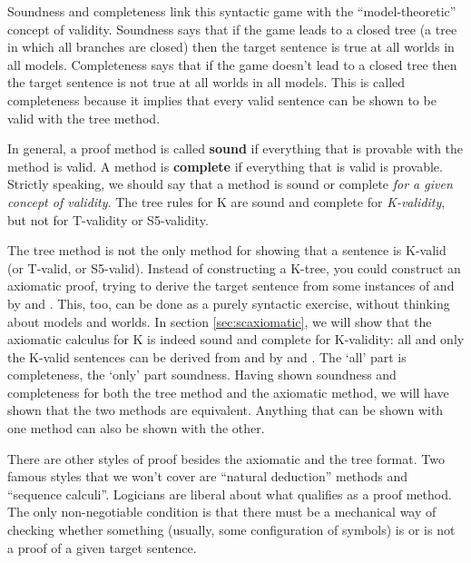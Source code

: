 Soundness and completeness link this syntactic game with the ``model-theoretic''
concept of validity. Soundness says that if the game leads to a closed tree (a
tree in which all branches are closed) then the target sentence is true at all
worlds in all models. Completeness says that if the game doesn't lead to a
closed tree then the target sentence is not true at all worlds in all models.
This is called completeness because it implies that every valid sentence can be
shown to be valid with the tree method.

In general, a proof method is called \textbf{sound} if everything that is
provable with the method is valid. A method is \textbf{complete} if everything
that is valid is provable. Strictly speaking, we should say that a method is
sound or complete \emph{for a given concept of validity}. The tree rules for K
are sound and complete for \emph{K-validity}, but not for T-validity or
S5-validity.

The tree method is not the only method for showing that a sentence is K-valid
(or T-valid, or S5-valid). Instead of constructing a K-tree, you could construct
an axiomatic proof, trying to derive the target sentence from some instances of
 and  by  and . This, too, can be done as a
purely syntactic exercise, without thinking about models and worlds. In section
\ref{sec:scaxiomatic}, we will show that the axiomatic calculus for K is indeed
sound and complete for K-validity: all and only the K-valid sentences can be
derived from  and  by  and . The `all' part is
completeness, the `only' part soundness. Having shown soundness and completeness
for both the tree method and the axiomatic method, we will have shown that the
two methods are equivalent. Anything that can be shown with one method can also
be shown with the other.

There are other styles of proof besides the axiomatic and the tree format. Two
famous styles that we won't cover are ``natural deduction'' methods and
``sequence calculi''. Logicians are liberal about what qualifies as a proof
method. The only non-negotiable condition is that there must be a mechanical way
of checking whether something (usually, some configuration of symbols) is or is
not a proof of a given target sentence.

